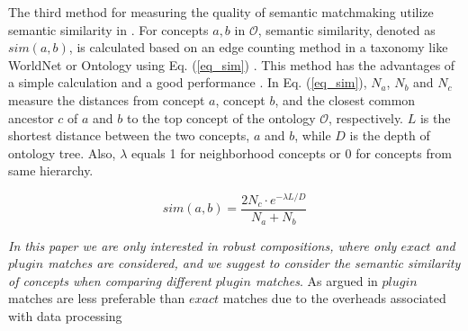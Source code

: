The third method for measuring the quality of semantic matchmaking utilize semantic similarity in \cite{shet2012new}. For concepts $a, b$ in $\mathcal{O}$, semantic similarity, denoted as $sim(a, b)$, is calculated based on an edge counting method in a taxonomy like WorldNet or Ontology using Eq. (\ref{eq_sim}) \cite{shet2012new}. This method has the advantages of a simple calculation and a good performance . In Eq. (\ref{eq_sim}), $N_a$, $N_b$ and $N_c$ measure the distances from concept $a$, concept $b$, and the closest common ancestor $c$ of $a$ and $b$ to the top concept of the ontology $\mathcal{O}$, respectively.  $L$ is the shortest distance between the two concepts, $a$ and $b$, while $D$ is the depth of ontology tree. Also, $\lambda$ equals 1 for neighborhood concepts or 0 for concepts from same hierarchy.

\begin{equation}
sim(a, b){=} \frac{2N_c \cdot e^{-\lambda L/D} }{N_{a}+N_{b}}
\label{eq_sim}
\end{equation}

\emph{In this paper we are only interested in robust compositions, where only $exact$ and $plugin$ matches are considered, and we suggest to consider the semantic similarity of concepts when comparing different $plugin$ matches}. As argued in \cite{lecue2009optimizing} $plugin$ matches are less preferable than $exact$ matches due to the overheads associated with data processing


